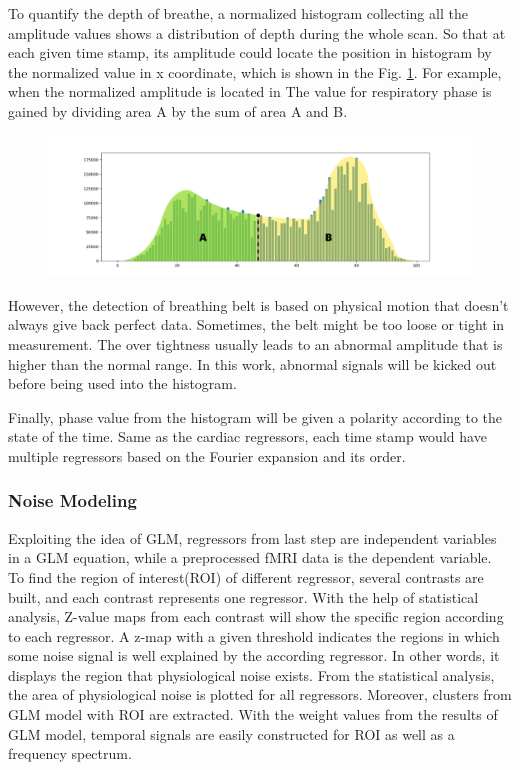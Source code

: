 To quantify the depth of breathe, a normalized histogram collecting all the amplitude values
shows a distribution of depth during the whole scan. 
So that at each given time stamp, its amplitude could locate the position in histogram by the normalized value in x coordinate,
which is shown in the Fig. \ref{fig:hist}. For example, when the normalized amplitude is located in 
The value for respiratory phase is gained by dividing area A by the sum of area A and B.

\begin{figure}[htp]
    \centering
    \includegraphics[width=\columnwidth]{Figures/histogram.png}
    \caption{}
    \label{fig:hist}
\end{figure}

However, the detection of breathing belt is based on physical motion that doesn't always give back
perfect data. Sometimes, the belt might be too loose or tight in measurement. The over tightness usually leads
to an abnormal amplitude that is higher than the normal range. In this work, abnormal signals will be 
kicked out before being used into the histogram.

Finally, phase value from the histogram will be given a polarity according to the state of the time.
Same as the cardiac regressors, each time stamp would have multiple regressors based 
on the Fourier expansion and its order.


\subsubsection{Noise Modeling}

Exploiting the idea of GLM, regressors from last step are independent variables in a GLM 
equation, while a preprocessed fMRI data is the dependent variable. 
To find the region of interest(ROI) of different regressor, several contrasts are built, and
each contrast represents one regressor. With the help of statistical analysis, 
Z-value maps from each contrast will show the specific region according to each regressor.
A z-map with a given threshold indicates the regions in which 
some noise signal is well explained by the according regressor.
In other words, it displays the region that physiological noise exists. 
From the statistical analysis, the area of physiological noise is plotted for all regressors.
Moreover, clusters from GLM model with ROI are extracted. With the weight values from the results of GLM model, 
temporal signals are easily constructed for ROI as well as a frequency spectrum.


